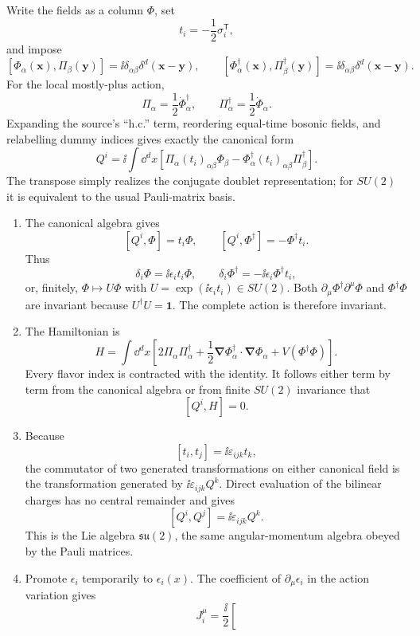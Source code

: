 \begin{enumerate}
Write the fields as a column \(\Phi\), set
\[
 t_i=-\frac12\sigma_i^{\mathsf T},
\]
and impose
\[
 [\Phi_\alpha(\mathbf x),\Pi_\beta(\mathbf y)]
 =\ii\delta_{\alpha\beta}\delta^d(\mathbf x-\mathbf y),
\qquad
 [\Phi_\alpha^\dagger(\mathbf x),\Pi_\beta^\dagger(\mathbf y)]
 =\ii\delta_{\alpha\beta}\delta^d(\mathbf x-\mathbf y).
\]
For the local mostly-plus action,
\[
 \Pi_\alpha=\frac12\dot\Phi_\alpha^\dagger,\qquad
 \Pi_\alpha^\dagger=\frac12\dot\Phi_\alpha.
\]
Expanding the source's ``h.c.'' term, reordering equal-time bosonic
fields, and relabelling dummy indices gives exactly the canonical form
\[
 Q^i=\ii\int \dd^dx\left[
 \Pi_\alpha(t_i)_{\alpha\beta}\Phi_\beta
 -\Phi_\alpha^\dagger(t_i)_{\alpha\beta}
  \Pi_\beta^\dagger\right].
\]
The transpose simply realizes the conjugate doublet representation;
for \(SU(2)\) it is equivalent to the usual Pauli-matrix basis.
\begin{enumerate}
\item
The canonical algebra gives
\[
 [Q^i,\Phi]=t_i\Phi,\qquad
 [Q^i,\Phi^\dagger]=-\Phi^\dagger t_i.
\]
Thus
\[
 \delta_i\Phi=\ii\epsilon_i t_i\Phi,\qquad
 \delta_i\Phi^\dagger=-\ii\epsilon_i\Phi^\dagger t_i,
\]
or, finitely, \(\Phi\mapsto U\Phi\) with
\(U=\exp(\ii\epsilon_i t_i)\in SU(2)\).  Both
\(\partial_\mu\Phi^\dagger\partial^\mu\Phi\) and
\(\Phi^\dagger\Phi\) are invariant because \(U^\dagger U=\mathbf1\).
The complete action is therefore invariant.
\item
The Hamiltonian is
\[
 H=\int \dd^dx\left[
 2\Pi_\alpha\Pi_\alpha^\dagger
 +\frac12\boldsymbol\nabla\Phi_\alpha^\dagger\cdot
             \boldsymbol\nabla\Phi_\alpha
 +V(\Phi^\dagger\Phi)\right].
\]
Every flavor index is contracted with the identity.  It follows either
term by term from the canonical algebra or from finite \(SU(2)\)
invariance that
\[
 [Q^i,H]=0.
\]
\item
Because
\[
 [t_i,t_j]=\ii\varepsilon_{ijk}t_k,
\]
the commutator of two generated transformations on either canonical
field is the transformation generated by
\(\ii\varepsilon_{ijk}Q^k\).  Direct evaluation of the bilinear charges
has no central remainder and gives
\[
 [Q^i,Q^j]=\ii\varepsilon_{ijk}Q^k.
\]
This is the Lie algebra \(\mathfrak{su}(2)\), the same angular-momentum
algebra obeyed by the Pauli matrices.
\item
Promote \(\epsilon_i\) temporarily to \(\epsilon_i(x)\).  The
coefficient of \(\partial_\mu\epsilon_i\) in the action variation gives
\[
 J_i^\mu
 =\frac{\ii}{2}\left[
\]
\end{enumerate}
\end{enumerate}
